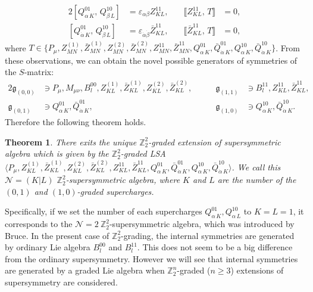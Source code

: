 \documentclass[a4paper,12pt]{article}
\def\nn{\nonumber}
\def\Z{\mathbb{Z}}
\def\ua{\alpha}
\def\da{\dot{\alpha}}
\def\ub{\beta}
\def\db{\dot{\beta}}
\def\g{\mathfrak{g}}
\theoremstyle{plain}
\newtheorem{thm}{Theorem}
\theoremstyle{definition}
\begin{document}
\begin{alignat}{2}
 [Q^{01}_{\ua\,K},\, Q^{10}_{\ub\,L}]&=\varepsilon_{\ua\ub} Z^{11}_{KL},\quad &
\llbracket Z^{11}_{KL}, \,T \rrbracket &=0
,\nn\\
 [Q^{01}_{\da\,K},\, Q^{10}_{\db\,L}]&=\varepsilon_{\da\db} \bar Z^{11}_{KL},&
\llbracket \bar Z^{11}_{KL}, \,T \rrbracket &=0,
\end{alignat} 
where $T\in \{ P_\mu, Z^{(1)}_{MN}, \bar Z^{(1)}_{MN}, Z^{(2)}_{MN}, \bar Z^{(2)}_{MN}, Z^{11}_{MN}, \bar Z^{11}_{MN}, Q_{\ua\,K}^{01}, \bar Q_{\da\,K}^{01}, Q_{\ua\,K}^{10}, \bar Q_{\da\,K}^{10}\}$.
From these observations, we can obtain the novel possible generators of symmetries of the $S$-matrix:
\begin{alignat}{2}
 \g_{(0,0)}&\ni P_\mu, M_{\mu\nu}, B^{00}_l, Z^{(1)}_{KL}
, \bar Z^{(1)}_{KL}, Z^{(2)}_{KL}, \bar Z^{(2)}_{KL}
,\qquad&
 \g_{(1,1)}&\ni B^{11}_l, Z^{11}_{KL}, \bar Z^{11}_{KL}
,\nn\\
 \g_{(0,1)}&\ni Q_{\ua\,K}^{01}, \bar Q_{\da\,K}^{01}
,\qquad&
 \g_{(1,0)}&\ni Q_{\ua\,K}^{10}, \bar Q_{\da\,K}^{10}
.
\end{alignat}
Therefore the following theorem holds.
\begin{thm}
There exits the unique $\Z_2^2$-graded extension of supersymmetric algebra which is given by the $\Z_2^2$-graded LSA $\langle P_\mu, Z^{(1)}_{KL}, \bar Z^{(1)}_{KL}, Z^{(2)}_{KL}, \bar Z^{(2)}_{KL}, Z^{11}_{KL}, \bar Z^{11}_{KL}, Q_{\ua\,K}^{01}, \bar Q_{\da\,K}^{01}, Q_{\ua\,K}^{10}, \bar Q_{\da\,K}^{10}\rangle$. We call this $\mathcal{N}=(K|L)$ $\Z_2^2$-supersymmetric algebra, where $K$ and $L$ are the number of the $(0,1)$ and $(1,0)$-graded supercharges.
\end{thm}
Specifically, if we set the number of each supercharges $Q_{\ua\,K}^{01}, Q_{\ua\,L}^{10}$ to $K=L=1$, it corresponds to the $\mathcal{N}=2\ \Z_2^2$-supersymmetric algebra, which was introduced by Bruce\cite{Bruce}.  
In the present case of $\Z_2^2$-grading, the internal symmetries are generated by ordinary Lie algebra $B^{00}_l$ and $B^{11}_l$. This does not seem to be a big difference from the ordinary supersymmetry. However we will see that internal symmetries are generated by a graded Lie algebra when $\Z_2^n$-graded ($n\geq 3$) extensions of supersymmetry are considered.

\end{document}
